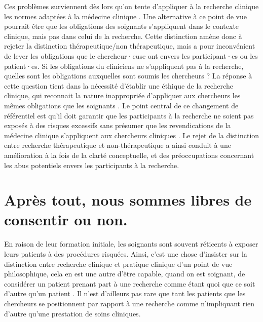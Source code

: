 \documentclass[
  12pt,
]{book}
\begin{document}
Ces problèmes surviennent dès lors qu'on tente d'appliquer à la recherche clinique les normes adaptées à la médecine clinique \citep{Miller2007}. Une alternative à ce point de vue pourrait être que les obligations des soignants s'appliquent dans le contexte clinique, mais pas dans celui de la recherche. Cette distinction amène donc à rejeter la distinction thérapeutique/non thérapeutique, mais a pour inconvénient de lever les obligations que le chercheur·euse ont envers les participant·es ou les patient·es. Si les obligations du cliniciens ne s'appliquent pas à la recherche, quelles sont les obligations auxquelles sont soumis les chercheurs ? La réponse à cette question tient dans la nécessité d'établir une éthique de la recherche clinique, qui reconnait la nature inappropriée d'appliquer aux chercheurs les mêmes obligations que les soignants \citep{Miller2007}. Le point central de ce changement de référentiel est qu'il doit garantir que les participants à la recherche ne soient pas exposés à des risques excessifs sans présumer que les revendications de la médecine clinique s'appliquent aux chercheurs cliniques \citep{Emanuel2000, Eckstein2003-ii}. Le rejet de la distinction entre recherche thérapeutique et non-thérapeutique a ainsi conduit à une amélioration à la fois de la clarté conceptuelle, et des préoccupations concernant les abus potentiels envers les participants à la recherche.

\chapter{Après tout, nous sommes libres de consentir ou non.}\label{apruxe8s-tout-nous-sommes-libres-de-consentir-ou-non.}

En raison de leur formation initiale, les soignants sont souvent réticents à exposer leurs patients à des procédures risquées. Ainsi, c'est une chose d'insister sur la distinction entre recherche clinique et pratique clinique d'un point de vue philosophique, cela en est une autre d'être capable, quand on est soignant, de considérer un patient prenant part à une recherche comme étant quoi que ce soit d'autre qu'un patient \citep{sep-clinical-research}. Il n'est d'ailleurs pas rare que tant les patients que les chercheurs se positionnent par rapport à une recherche comme n'impliquant rien d'autre qu'une prestation de soins cliniques.
\end{document}
